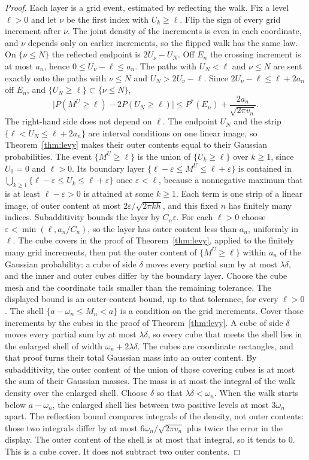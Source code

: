 \begin{proof}
Each layer is a grid event, estimated by reflecting the walk. Fix a level $\ell>0$ and let $\nu$ be the first index with $U_k\ge\ell$. Flip the sign of every grid increment after $\nu$. The joint density of the increments is even in each coordinate, and $\nu$ depends only on earlier increments, so the flipped walk has the same law. On $\{\nu\le N\}$ the reflected endpoint is $2U_\nu-U_N$. Off $E_n$ the crossing increment is at most $a_n$, hence $0\le U_\nu-\ell\le a_n$. The paths with $U_N<\ell$ and $\nu\le N$ are sent exactly onto the paths with $\nu\le N$ and $U_N>2U_\nu-\ell$. Since $2U_\nu-\ell\le\ell+2a_n$ off $E_n$, and $\{U_N\ge\ell\}\subset\{\nu\le N\}$,
\[
 \bigl|P(M^U\ge\ell)-2P(U_N\ge\ell)\bigr|
 \le P^*(E_n)+\frac{2a_n}{\sqrt{2\pi v_n}}.
\]
The right-hand side does not depend on $\ell$. The endpoint $U_N$ and the strip $\{\ell<U_N\le\ell+2a_n\}$ are interval conditions on one linear image, so Theorem~\ref{thm:levy} makes their outer contents equal to their Gaussian probabilities. The event $\{M^U\ge\ell\}$ is the union of $\{U_k\ge\ell\}$ over $k\ge1$, since $U_0=0$ and $\ell>0$. Its boundary layer $\{\ell-\varepsilon\le M^U\le\ell+\varepsilon\}$ is contained in $\bigcup_{k\ge1}\{\ell-\varepsilon\le U_k\le\ell+\varepsilon\}$ once $\varepsilon<\ell$, because a nonnegative maximum that is at least $\ell-\varepsilon>0$ is attained at some $k\ge1$. Each term is one strip of a linear image, of outer content at most $2\varepsilon/\sqrt{2\pi kh}$, and this fixed $n$ has finitely many indices. Subadditivity bounds the layer by $C_n\varepsilon$. For each $\ell>0$ choose $\varepsilon<\min(\ell,a_n/C_n)$, so the layer has outer content less than $a_n$, uniformly in $\ell$. The cube covers in the proof of Theorem~\ref{thm:levy}, applied to the finitely many grid increments, then put the outer content of $\{M^U\ge\ell\}$ within $a_n$ of the Gaussian probability: a cube of side $\delta$ moves every partial sum by at most $\lambda\delta$, and the inner and outer cubes differ by the boundary layer. Choose the cube mesh and the coordinate tails smaller than the remaining tolerance. The displayed bound is an outer-content bound, up to that tolerance, for every $\ell>0$. The shell $\{a-\omega_n\le M_n<a\}$ is a condition on the grid increments. Cover those increments by the cubes in the proof of Theorem~\ref{thm:levy}. A cube of side $\delta$ moves every partial sum by at most $\lambda\delta$, so every cube that meets the shell lies in the enlarged shell of width $\omega_n+2\lambda\delta$. The cubes are coordinate rectangles, and that proof turns their total Gaussian mass into an outer content. By subadditivity, the outer content of the union of those covering cubes is at most the sum of their Gaussian masses. The mass is at most the integral of the walk density over the enlarged shell. Choose $\delta$ so that $\lambda\delta<\omega_n$. When the walk starts below $a-\omega_n$, the enlarged shell lies between two positive levels at most $3\omega_n$ apart. The reflection bound compares integrals of the density, not outer contents: those two integrals differ by at most $6\omega_n/\sqrt{2\pi v_n}$ plus twice the error in the display. The outer content of the shell is at most that integral, so it tends to $0$. This is a cube cover. It does not subtract two outer contents. 
\end{proof}
